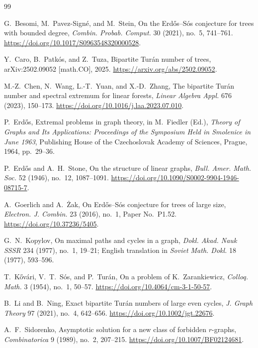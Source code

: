 \documentclass[12pt]{article}
\theoremstyle{definition}
\theoremstyle{remark}
\begin{document}
\begin{thebibliography}{99}

G.~Besomi, M.~Pavez-Sign\'e, and M.~Stein,
On the Erd\H{o}s--S\'os conjecture for trees with bounded degree,
\emph{Combin. Probab. Comput.} 30 (2021), no.~5, 741--761.
\url{https://doi.org/10.1017/S0963548320000528}.

Y.~Caro, B.~Patk\'os, and Z.~Tuza,
Bipartite Tur\'an number of trees,
arXiv:2502.09052 [math.CO], 2025.
\url{https://arxiv.org/abs/2502.09052}.

M.-Z.~Chen, N.~Wang, L.-T.~Yuan, and X.-D.~Zhang,
The bipartite Tur\'an number and spectral extremum for linear forests,
\emph{Linear Algebra Appl.} 676 (2023), 150--173.
\url{https://doi.org/10.1016/j.laa.2023.07.010}.

P.~Erd\H{o}s,
Extremal problems in graph theory,
in M.~Fiedler (Ed.),
\emph{Theory of Graphs and Its Applications:
Proceedings of the Symposium Held in Smolenice in June 1963},
Publishing House of the Czechoslovak Academy of Sciences,
Prague, 1964, pp.~29--36.

P.~Erd\H{o}s and A.~H.~Stone,
On the structure of linear graphs,
\emph{Bull. Amer. Math. Soc.} 52 (1946), no.~12, 1087--1091.
\url{https://doi.org/10.1090/S0002-9904-1946-08715-7}.

A.~Goerlich and A.~\.Zak,
On Erd\H{o}s--S\'os conjecture for trees of large size,
\emph{Electron. J. Combin.} 23 (2016), no.~1, Paper No.~P1.52.
\url{https://doi.org/10.37236/5405}.

G.~N.~Kopylov,
On maximal paths and cycles in a graph,
\emph{Dokl. Akad. Nauk SSSR} 234 (1977), no.~1, 19--21;
English translation in
\emph{Soviet Math. Dokl.} 18 (1977), 593--596.

T.~K\H{o}v\'ari, V.~T.~S\'os, and P.~Tur\'an,
On a problem of K.~Zarankiewicz,
\emph{Colloq. Math.} 3 (1954), no.~1, 50--57.
\url{https://doi.org/10.4064/cm-3-1-50-57}.

B.~Li and B.~Ning,
Exact bipartite Tur\'an numbers of large even cycles,
\emph{J. Graph Theory} 97 (2021), no.~4, 642--656.
\url{https://doi.org/10.1002/jgt.22676}.

A.~F.~Sidorenko,
Asymptotic solution for a new class of forbidden $r$-graphs,
\emph{Combinatorica} 9 (1989), no.~2, 207--215.
\url{https://doi.org/10.1007/BF02124681}.


\end{thebibliography}
\end{document}
